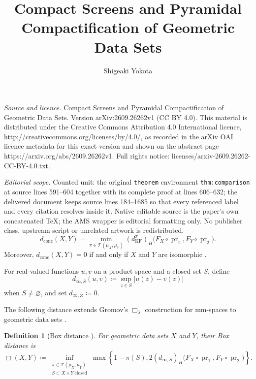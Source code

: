 \documentclass[10pt,a4paper]{amsart}
\newtheorem{definition}[theorem]{Definition}
\newcommand{\T}{\mathcal T}
\newcommand{\dconc}{d_{\mathrm{conc}}}
\newcommand{\kf}{d_{\operatorname{KF}}}
\DeclareMathOperator{\pr}{pr}
\begin{document}
\title[Compact Screens and Pyramidal Compactification of Geometric ]{Compact Screens and Pyramidal Compactification of Geometric Data Sets}
\author{Shigeaki Yokota}
\date{}
\maketitle
\noindent\emph{Source and licence.} Compact Screens and Pyramidal Compactification of Geometric Data Sets. Version arXiv:2609.26262v1 (CC BY 4.0). This material is distributed under the Creative Commons Attribution 4.0 International licence, http://creativecommons.org/licenses/by/4.0/, as recorded in the arXiv OAI licence metadata for this exact version and shown on the abstract page https://arxiv.org/abs/2609.26262v1. Full rights notice: licenses/arxiv-2609.26262-CC-BY-4.0.txt.\par\smallskip
\noindent\textit{Editorial scope.} Counted unit: the original \texttt{theorem} environment \texttt{thm:comparison} at source lines 591--604 together with its complete proof at lines 606--632; the delivered document keeps source lines 184--1685 so that every referenced label and every citation resolves inside it. Native editable source is the paper's own concatenated TeX; the AMS wrapper is editorial formatting only. No publisher class, upstream script or unrelated artwork is redistributed.
\begin{equation}
\label{eq:dconc-coupling}
\dconc(X,Y)=\min_{\pi\in\T(\mu_X,\mu_Y)}(\kf^\pi)_H\bigl(F_X\circ\pr_1,F_Y\circ\pr_2\bigr).
\end{equation}
Moreover, $\dconc(X,Y)=0$ if and only if $X$ and $Y$ are isomorphic \cite[Theorem~3.10]{hanika2022gds}.

For real-valued functions $u,v$ on a product space and a closed set $S$, define
\[d_{\infty,S}(u,v)\coloneqq\sup_{z\in S}|u(z)-v(z)|\]
when $S\neq\varnothing$, and set $d_{\infty,\varnothing}\coloneqq0$.

The following distance extends Gromov's $\Box_\lambda$ construction for mm-spaces \cite[Definitions~3\(\frac12\).2--3\(\frac12\).3, pp.~116--117]{gromov2007met} to geometric data sets \cite[Definition~5.7]{gds1}.

\begin{definition}[Box distance {\cite[Definition~5.7]{gds1}}]
\label{def:box}
For geometric data sets $X$ and $Y$, their \emph{Box distance} is
\begin{equation}
\label{eq:box-formula}
\Box(X,Y)\coloneqq\inf_{\substack{\pi\in\T(\mu_X,\mu_Y)\\S\subset X\times Y\ \mathrm{closed}}}\max\left\{1-\pi(S),2(d_{\infty,S})_H\bigl(F_X\circ\pr_1,F_Y\circ\pr_2\bigr)\right\}.
\end{equation}
\end{definition}
\end{document}
